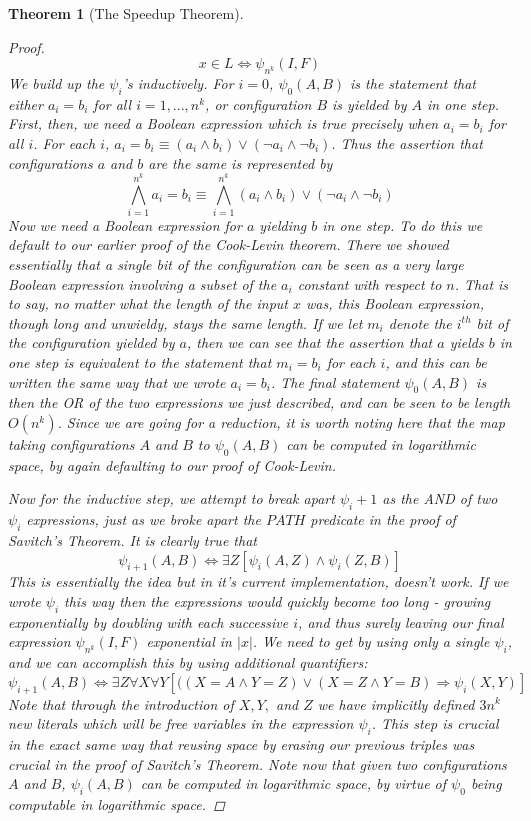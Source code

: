 \documentclass{article}
\theoremstyle{definition}
\theoremstyle{plain}
\theoremstyle{theorem}
\newtheorem{theorem}{Theorem}[section]
\begin{document}
\begin{theorem}[The Speedup Theorem]
\begin{proof}
    \[ x \in L \iff \psi_{n^k}(I,F) \]
    We build up the $\psi_i$'s inductively. For $i=0$, $\psi_0(A,B)$ is the statement that either $a_i = b_i$ for all $i=1,...,n^k$, or configuration $B$ is yielded by $A$ in one step. First, then, we need a Boolean expression which is true precisely when $a_i = b_i$ for all $i$. For each $i$, $a_i=b_i \equiv (a_i \wedge b_i) \vee (\neg a_i \wedge \neg b_i)$. Thus the assertion that configurations $a$ and $b$ are the same is represented by
    \[ \bigwedge_{i=1}^{n^k}a_i = b_i \equiv \bigwedge_{i=1}^{n^k}(a_i \wedge b_i) \vee (\neg a_i \wedge \neg b_i) \]
    Now we need a Boolean expression for $a$ yielding $b$ in one step. To do this we default to our earlier proof of the Cook-Levin theorem. There we showed essentially that a single bit of the configuration can be seen as a very large Boolean expression involving a subset of the $a_i$ \textit{constant with respect to $n$}. That is to say, no matter what the length of the input $x$ was, this Boolean expression, though long and unwieldy, stays the same length. If we let $m_i$ denote the $i^{th}$ bit of the configuration yielded by $a$, then we can see that the assertion that $a$ yields $b$ in one step is equivalent to the statement that $m_i = b_i$ for each $i$, and this can be written the same way that we wrote $a_i=b_i$. The final statement $\psi_0(A,B)$ is then the OR of the two expressions we just described, and can be seen to be length $O(n^k)$. Since we are going for a reduction, it is worth noting here that the map taking configurations $A$ and $B$ to $\psi_0(A,B)$ can be computed in logarithmic space, by again defaulting to our proof of Cook-Levin.
    \par Now for the inductive step, we attempt to break apart $\psi_i+1$ as the AND of two $\psi_i$ expressions, just as we broke apart the $PATH$ predicate in the proof of Savitch's Theorem. It is clearly true that
    \[ \psi_{i+1}(A,B) \iff \exists Z [\psi_i(A,Z) \wedge \psi_i(Z,B)] \]
    This is essentially the idea but in it's current implementation, doesn't work. If we wrote $\psi_i$ this way then the expressions would quickly become too long - growing exponentially by doubling with each successive $i$, and thus surely leaving our final expression $\psi_{n^k}(I,F)$ exponential in $|x|$. We need to get by using only a single $\psi_i$, and we can accomplish this by using additional quantifiers:
    \[  \psi_{i+1}(A,B) \iff \exists Z \forall X \forall Y [((X=A \wedge Y=Z) \vee (X = Z \wedge Y=B) \Rightarrow \psi_i(X,Y)] \]
    Note that through the introduction of $X,Y,$ and $Z$ we have implicitly defined $3n^k$ new literals which will be free variables in the expression $\psi_i$. This step is crucial in the exact same way that reusing space by erasing our previous triples was crucial in the proof of Savitch's Theorem. Note now that given two configurations $A$ and $B$, $\psi_i(A,B)$ can be computed in logarithmic space, by virtue of $\psi_0$ being computable in logarithmic space. 

\end{proof}
\end{theorem}
\end{document}
